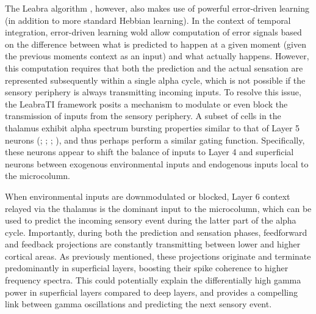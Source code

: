 \documentclass[defaultstyle,12pt]{thesis}
\begin{document}
{The Leabra algorithm \cite{OReillyMunakata00,OReillyMunakataFrankEtAl12}, however, also makes use of powerful error-driven learning (in addition to more standard Hebbian learning). In the context of temporal integration, error-driven learning wold allow computation of error signals based on the difference between what is predicted to happen at a given moment (given the previous moments context as an input) and what actually happens. However, this computation requires that both the prediction and the actual sensation are represented subsequently within a single alpha cycle, which is not possible if the sensory periphery is always transmitting incoming inputs. To resolve this issue, the LeabraTI framework posits a mechanism to modulate or even block the transmission of inputs from the sensory periphery. A subset of cells in the thalamus exhibit alpha spectrum bursting properties similar to that of Layer 5 neurons (; ; ; ), and thus perhaps perform a similar gating function. Specifically, these neurons appear to shift the balance of inputs to Layer 4 and superficial neurons between exogenous environmental inputs and endogenous inputs local to the microcolumn.

When environmental inputs are downmodulated or blocked, Layer 6 context relayed via the thalamus is the dominant input to the microcolumn, which can be used to predict the incoming sensory event during the latter part of the alpha cycle. Importantly, during both the prediction and sensation phases, feedforward and feedback projections are constantly transmitting between lower and higher cortical areas. As previously mentioned, these projections originate and terminate predominantly in superficial layers, boosting their spike coherence to higher frequency spectra. This could potentially explain the differentially high gamma power in superficial layers compared to deep layers, and provides a compelling link between gamma oscillations and predicting the next sensory event.

}
\end{document}
